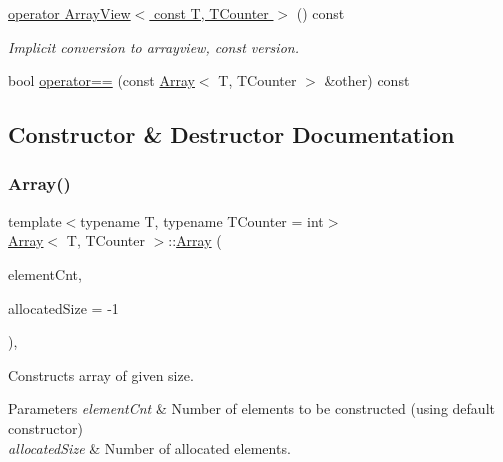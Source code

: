 \begin{DoxyCompactItemize}
\hypertarget{classArray_ab2c82ba3fe89a0eb1e263cced745ce25}{}\label{classArray_ab2c82ba3fe89a0eb1e263cced745ce25} 
\hyperlink{classArray_ab2c82ba3fe89a0eb1e263cced745ce25}{operator Array\+View$<$ const T, T\+Counter $>$} () const
\begin{DoxyCompactList}\small\item\em Implicit conversion to arrayview, const version. \end{DoxyCompactList}\item 
bool \hyperlink{classArray_a7eff7030d460a572a7076f2ed2464448}{operator==} (const \hyperlink{classArray}{Array}$<$ T, T\+Counter $>$ \&other) const
\end{DoxyCompactItemize}


\subsection{Constructor \& Destructor Documentation}
\hypertarget{classArray_a53a67b010c774165bbf8b64e1d4ee0e2}{}\label{classArray_a53a67b010c774165bbf8b64e1d4ee0e2} 
\subsubsection{\texorpdfstring{Array()}{Array()}\hspace{0.1cm}{\footnotesize\ttfamily [1/2]}}
{\footnotesize\ttfamily template$<$typename T, typename T\+Counter = int$>$ \\
\hyperlink{classArray}{Array}$<$ T, T\+Counter $>$\+::\hyperlink{classArray}{Array} (\begin{DoxyParamCaption}\item[{const T\+Counter}]{element\+Cnt,  }\item[{const T\+Counter}]{allocated\+Size = {\ttfamily -\/1} }\end{DoxyParamCaption})\hspace{0.3cm}{\ttfamily [inline]}, {\ttfamily [explicit]}}

Constructs array of given size. 
\begin{DoxyParams}{Parameters}
{\em element\+Cnt} & Number of elements to be constructed (using default constructor) \\
\hline
{\em allocated\+Size} & Number of allocated elements. \\
\hline
\end{DoxyParams}
\hypertarget{classArray_a4f87480b3f5553c15c70ddad372602fd}{}\label{classArray_a4f87480b3f5553c15c70ddad372602fd} 
